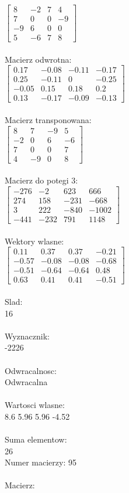 \documentclass[a4paper,12pt]{article}
\begin{document}
$\begin{bmatrix} 8&-2&7&4\\7&0&0&-9\\-9&6&0&0\\5&-6&7&8 \end{bmatrix}$
\\
\\
Macierz odwrotna:\\

$\begin{bmatrix} 0.17&-0.08&-0.11&-0.17\\0.25&-0.11&0&-0.25\\-0.05&0.15&0.18&0.2\\0.13&-0.17&-0.09&-0.13 \end{bmatrix}$
\\
\\
Macierz transponowana:\\

$\begin{bmatrix} 8&7&-9&5\\-2&0&6&-6\\7&0&0&7\\4&-9&0&8 \end{bmatrix}$
\\
\\
Macierz do potegi 3:\\

$\begin{bmatrix} -276&-2&623&666\\274&158&-231&-668\\3&222&-840&-1002\\-441&-232&791&1148 \end{bmatrix}$
\\
\\
Wektory wlasne:\\

$\begin{bmatrix} 0.11&0.37&0.37&-0.21\\-0.57&-0.08&-0.08&-0.68\\-0.51&-0.64&-0.64&0.48\\0.63&0.41&0.41&-0.51 \end{bmatrix}$
\\
\\
Slad:\\
16
\\
\\
Wyznacznik:\\
-2226
\\
\\
Odwracalnosc:\\
Odwracalna
\\
\\
Wartosci wlasne:\\
8.6 5.96 5.96 -4.52
\\
\\
Suma elementow:\\
26
\\
\newpage
Numer macierzy:
95
\\
\\
Macierz:\\
\end{document}
